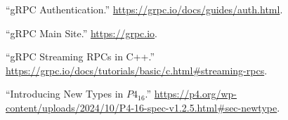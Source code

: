 \documentclass[11pt]{article}
\begin{document}
{{\begin{thebibliography}{45}
\mdbibitemlabel{{}[10]}\textquotedblleft{}gRPC Authentication.\textquotedblright{} \href{https://grpc.io/docs/guides/auth.html}{{\ttfamily https://\hspace{0pt}grpc.\hspace{0pt}io/\hspace{0pt}docs/\hspace{0pt}guides/\hspace{0pt}auth.\hspace{0pt}html}}.\label{grpcauth}%

\mdbibitemlabel{{}[11]}\textquotedblleft{}gRPC Main Site.\textquotedblright{} \href{https://grpc.io}{{\ttfamily https://\hspace{0pt}grpc.\hspace{0pt}io}}.\label{grpc}%

\mdbibitemlabel{{}[12]}\textquotedblleft{}gRPC Streaming RPCs in C++.\textquotedblright{} \href{https://grpc.io/docs/tutorials/basic/c.html\%23streaming-rpcs}{{\ttfamily https://\hspace{0pt}grpc.\hspace{0pt}io/\hspace{0pt}docs/\hspace{0pt}tutorials/\hspace{0pt}basic/\hspace{0pt}c.\hspace{0pt}html\#\hspace{0pt}streaming-\hspace{0pt}rpcs}}.\label{grpcstreamc}%

\mdbibitemlabel{{}[13]}\textquotedblleft{}Introducing New Types in $P4_{16}$.\textquotedblright{} \href{https://p4.org/wp-content/uploads/2024/10/P4-16-spec-v1.2.5.html\%23sec-newtype}{{\ttfamily https://\hspace{0pt}p4.\hspace{0pt}org/\hspace{0pt}wp-\hspace{0pt}content/\hspace{0pt}uploads/\hspace{0pt}2024/\hspace{0pt}10/\hspace{0pt}P4-\hspace{0pt}16-\hspace{0pt}spec-\hspace{0pt}v1.\hspace{0pt}2.\hspace{0pt}5.\hspace{0pt}html\#\hspace{0pt}sec-\hspace{0pt}newtype}}.\label{p4newtypes}%


\end{thebibliography}}}
\end{document}
